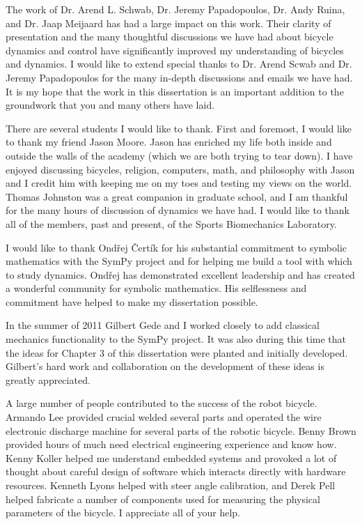 The work of Dr. Arend L. Schwab, Dr. Jeremy Papadopoulos, Dr. Andy Ruina, and
Dr. Jaap Meijaard has had a large impact on this work. Their clarity of
presentation and the many thoughtful discussions we have had about bicycle
dynamics and control have significantly improved my understanding of bicycles
and dynamics. I would like to extend special thanks to Dr. Arend Scwab and Dr.
Jeremy Papadopoulos for the many in-depth discussions and emails we have had.
It is my hope that the work in this dissertation is an important addition to
the groundwork that you and many others have laid.

There are several students I would like to thank. First and foremost, I would
like to thank my friend Jason Moore. Jason has enriched my life both inside and
outside the walls of the academy (which we are both trying to tear down). I
have enjoyed discussing bicycles, religion, computers, math, and philosophy
with Jason and I credit him with keeping me on my toes and testing my views on
the world. Thomas Johnston was a great companion in graduate school, and I am
thankful for the many hours of discussion of dynamics we have had. I would like
to thank all of the members, past and present, of the Sports Biomechanics
Laboratory.

I would like to thank Ond\v{r}ej \v{C}ert\'{i}k for his substantial commitment
to symbolic mathematics with the SymPy project and for helping me build a tool
with which to study dynamics. Ond\v{r}ej has demonstrated excellent leadership
and has created a wonderful community for symbolic mathematics.  His
selflessness and commitment have helped to make my dissertation possible.

In the summer of 2011 Gilbert Gede and I worked closely to add classical
mechanics functionality to the SymPy project. It was also during this time that
the ideas for Chapter 3 of this dissertation were planted and initially
developed. Gilbert's hard work and collaboration on the development of these
ideas is greatly appreciated.

A large number of people contributed to the success of the robot bicycle.
Armando Lee provided crucial welded several parts and operated the wire
electronic discharge machine for several parts of the robotic bicycle. Benny
Brown provided hours of much need electrical engineering experience and know
how. Kenny Koller helped me understand embedded systems and provoked a lot of
thought about careful design of software which interacts directly with hardware
resources. Kenneth Lyons helped with steer angle calibration, and Derek Pell
helped fabricate a number of components used for measuring the physical
parameters of the bicycle. I appreciate all of your help.

